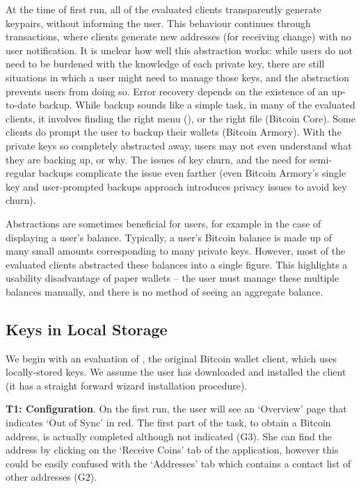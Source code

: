 At the time of first run, all of the evaluated clients transparently generate keypairs, without informing the user. This behaviour continues through transactions, where clients generate new addresses (\eg for receiving change) with no user notification. It is unclear how well this abstraction works: while users do not need to be burdened with the knowledge of each private key, there are still situations in which a user might need to manage those keys, and the abstraction prevents users from doing so. Error recovery depends on the existence of an up-to-date backup. While backup sounds like a simple task, in many of the evaluated clients, it involves finding the right menu (), or the right file (Bitcoin Core). Some clients do prompt the user to backup their wallets (\eg Bitcoin Armory). With the private keys so completely abstracted away, users may not even understand what they are backing up, or why. The issues of key churn, and the need for semi-regular backups complicate the issue even farther (\eg even Bitcoin Armory's single key and user-prompted backups approach introduces privacy issues to avoid key churn).\

Abstractions are sometimes beneficial for users, for example in the case of displaying a user's balance. Typically, a user's Bitcoin balance is made up of many small amounts corresponding to many private keys. However, most of the evaluated clients abstracted these balances into a single figure. This highlights a usability disadvantage of paper wallets -- the user must manage these multiple balances manually, and there is no method of seeing an aggregate balance.



\subsection{Keys in Local Storage}
We begin with an evaluation of \bitcoinclient, the original Bitcoin wallet client, which uses locally-stored keys. We assume the user has downloaded and installed the \bitcoinclient client (it has a straight forward wizard installation procedure).

\textbf{T1: Configuration}. 
On the first run, the user will see an `Overview' page that indicates `Out of Sync' in red. The first part of the task, to obtain a Bitcoin address, is actually completed although not indicated (G3). She can find the address by clicking on the `Receive Coins' tab of the application, however this could be easily confused with the `Addresses' tab which contains a contact list of other addresses (G2).

